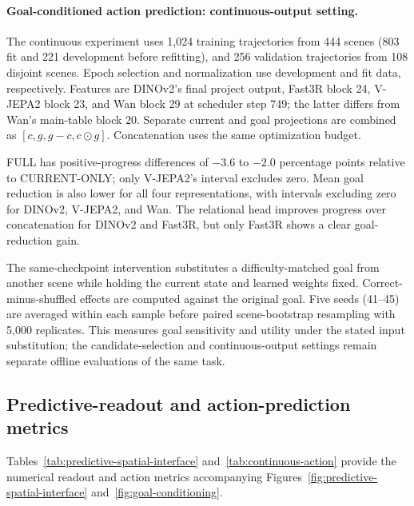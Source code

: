 \documentclass{article} %
\begin{document}
\paragraph{Goal-conditioned action prediction: continuous-output setting.}
The continuous experiment uses 1,024 training trajectories from 444 scenes
(803 fit and 221 development before refitting), and 256 validation
trajectories from 108 disjoint scenes. Epoch selection and normalization
use development and fit data, respectively. Features are DINOv2's final
project output, Fast3R block 24, V-JEPA2 block 23, and Wan block 29 at
scheduler step 749; the latter differs from Wan's main-table block 20.
Separate current and goal projections are combined as
$[c,g,g-c,c\odot g]$. Concatenation uses the same optimization budget.

FULL has positive-progress differences of $-3.6$ to $-2.0$ percentage
points relative to CURRENT-ONLY; only V-JEPA2's interval excludes zero.
Mean goal reduction is also lower for all four representations, with
intervals excluding zero for DINOv2, V-JEPA2, and Wan. The relational
head improves progress over concatenation for DINOv2 and Fast3R, but
only Fast3R shows a clear goal-reduction gain.

The same-checkpoint intervention substitutes a difficulty-matched goal
from another scene while holding the current state and learned weights
fixed. Correct-minus-shuffled effects are computed against the original
goal. Five seeds (41--45) are averaged within each sample before paired
scene-bootstrap resampling with 5,000 replicates. This measures goal
sensitivity and utility under the stated input substitution; the
candidate-selection and continuous-output settings remain separate offline
evaluations of the same task.


\subsection{Predictive-readout and action-prediction metrics}
\label{sec:readout-action-tables}

Tables~\ref{tab:predictive-spatial-interface} and~\ref{tab:continuous-action}
provide the numerical readout and action metrics accompanying
Figures~\ref{fig:predictive-spatial-interface} and~\ref{fig:goal-conditioning}.
\end{document}
